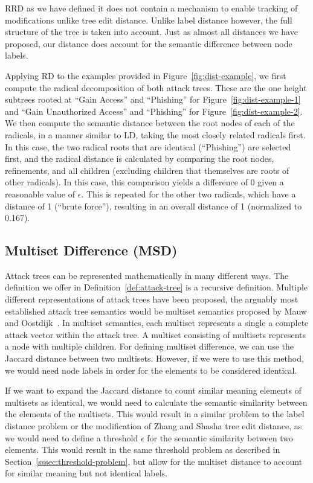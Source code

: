 RRD as we have defined it does not contain a mechanism to enable tracking of modifications unlike tree edit distance. Unlike label distance however, the full structure of the tree is taken into account. Just as almost all distances we have proposed, our distance does account for the semantic difference between node labels.

Applying RD to the examples provided in Figure~\ref{fig:dist-example}, we first compute the radical decomposition of both attack trees. These are the one height subtrees rooted at ``Gain Access'' and ``Phishing'' for Figure~\ref{fig:dist-example-1} and ``Gain Unauthorized Access'' and ``Phishing'' for Figure~\ref{fig:dist-example-2}. We then compute the semantic distance between the root nodes of each of the radicals, in a manner similar to LD, taking the most closely related radicals first. In this case, the two radical roots that are identical (``Phishing'') are selected first, and the radical distance is calculated by comparing the root nodes, refinements, and all children (excluding children that themselves are roots of other radicals). In this case, this comparison yields a difference of 0 given a reasonable value of $\epsilon$. This is repeated for the other two radicals, which have a distance of 1 (``brute force''), resulting in an overall distance of 1 (normalized to 0.167).


\subsection{Multiset Difference (MSD)}
\label{ssec:msd}

Attack trees can be represented mathematically in many different ways. The definition we offer in Definition~\ref{def:attack-tree} is a recursive definition. Multiple different representations of attack trees have been proposed, the arguably most established attack tree semantics would be multiset semantics proposed by Mauw and Oostdijk~\cite{mauw_foundations_2006}. In multiset semantics, each multiset represents a single a complete attack vector within the attack tree. A multiset consisting of multisets represents a node with multiple children. For defining multiset difference, we can use the Jaccard distance between two multisets. However, if we were to use this method, we would need node labels in order for the elements to be considered identical.

If we want to expand the Jaccard distance to count similar meaning elements of multisets as identical, we would need to calculate the semantic similarity between the elements of the multisets. This would result in a similar problem to the label distance problem or the modification of Zhang and Shasha tree edit distance, as we would need to define a threshold $\epsilon$ for the semantic similarity between two elements. This would result in the same threshold problem as described in Section~\ref{sssec:threshold-problem}, but allow for the multiset distance to account for similar meaning but not identical labels.

